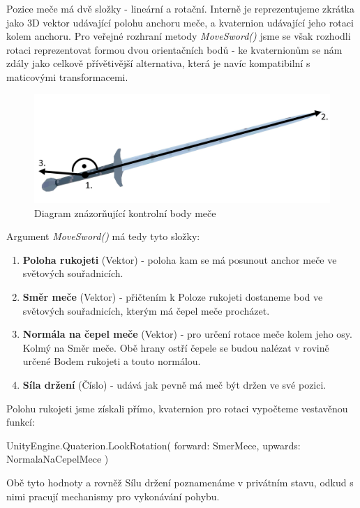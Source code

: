Pozice meče má dvě složky - lineární a rotační. Interně je reprezentujeme zkrátka jako 3D vektor udávající polohu anchoru meče, a kvaternion udávající jeho rotaci kolem anchoru. Pro veřejné rozhraní metody \textit{MoveSword()} jsme se však rozhodli rotaci reprezentovat formou dvou orientačních bodů - ke kvaternionům se nám zdály jako celkově přívětivější alternativa, která je navíc kompatibilní s maticovými transformacemi.

\begin{figure}[ht]\centering
  \center
  \includegraphics[width=140mm]{../img/diagram-swordPositioning.png}
  \caption{Diagram znázorňující kontrolní body meče}
  \label{obr05:swordPositioningDiagram}
\end{figure} 

Argument \textit{MoveSword()} má tedy tyto složky:
\begin{enumerate}
    \item \textbf{Poloha rukojeti} (Vektor) - poloha kam se má posunout anchor meče ve světových souřadnicích.
    \item \textbf{Směr meče} (Vektor) - přičtením k Poloze rukojeti dostaneme bod ve světových souřadnicích, kterým má čepel meče procházet.
    \item \textbf{Normála na čepel meče} (Vektor) - pro určení rotace meče kolem jeho osy. Kolmý na Směr meče. Obě hrany ostří čepele se budou nalézat v rovině určené Bodem rukojeti a touto normálou.   
    \item \textbf{Síla držení} (Číslo) - udává jak pevně má meč být držen ve své pozici.
\end{enumerate}

Polohu rukojeti jsme získali přímo, kvaternion pro rotaci vypočteme vestavěnou funkcí:

\begin{code}
 UnityEngine.Quaterion.LookRotation(
   forward: SmerMece,
   upwards: NormalaNaCepelMece
 )
\end{code}

Obě tyto hodnoty a rovněž Sílu držení poznamenáme v privátním stavu, odkud s nimi pracují mechanismy pro vykonávání pohybu.

